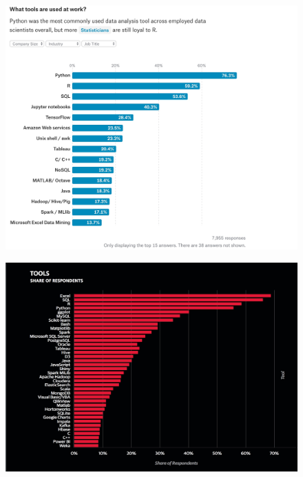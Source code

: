     \begin{figure}[ht] %
      \centering
      \includegraphics[width = 15 cm]{./viz/ext/Kaggle_DS_Tools_Survey.jpeg}
    \end{figure}

    \begin{figure}[ht] %
      \centering
      \includegraphics[width = 15 cm]{./viz/ext/OR_DS_Tools_Survey.jpeg}
    \end{figure}
    
